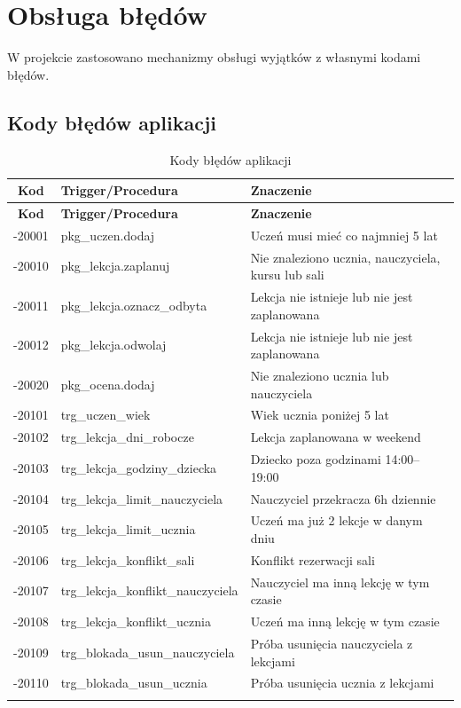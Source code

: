 \documentclass[12pt,a4paper]{article}
\begin{document}
\section{Obsługa błędów}

W projekcie zastosowano mechanizmy obsługi wyjątków z własnymi kodami błędów.

\subsection{Kody błędów aplikacji}

\begin{longtable}{|c|l|p{7cm}|}
\hline
\textbf{Kod} & \textbf{Trigger/Procedura} & \textbf{Znaczenie} \\
\hline
\endfirsthead
\hline
\textbf{Kod} & \textbf{Trigger/Procedura} & \textbf{Znaczenie} \\
\hline
\endhead
-20001 & pkg\_uczen.dodaj & Uczeń musi mieć co najmniej 5 lat \\
\hline
-20010 & pkg\_lekcja.zaplanuj & Nie znaleziono ucznia, nauczyciela, kursu lub sali \\
\hline
-20011 & pkg\_lekcja.oznacz\_odbyta & Lekcja nie istnieje lub nie jest zaplanowana \\
\hline
-20012 & pkg\_lekcja.odwolaj & Lekcja nie istnieje lub nie jest zaplanowana \\
\hline
-20020 & pkg\_ocena.dodaj & Nie znaleziono ucznia lub nauczyciela \\
\hline
-20101 & trg\_uczen\_wiek & Wiek ucznia poniżej 5 lat \\
\hline
-20102 & trg\_lekcja\_dni\_robocze & Lekcja zaplanowana w weekend \\
\hline
-20103 & trg\_lekcja\_godziny\_dziecka & Dziecko poza godzinami 14:00--19:00 \\
\hline
-20104 & trg\_lekcja\_limit\_nauczyciela & Nauczyciel przekracza 6h dziennie \\
\hline
-20105 & trg\_lekcja\_limit\_ucznia & Uczeń ma już 2 lekcje w danym dniu \\
\hline
-20106 & trg\_lekcja\_konflikt\_sali & Konflikt rezerwacji sali \\
\hline
-20107 & trg\_lekcja\_konflikt\_nauczyciela & Nauczyciel ma inną lekcję w tym czasie \\
\hline
-20108 & trg\_lekcja\_konflikt\_ucznia & Uczeń ma inną lekcję w tym czasie \\
\hline
-20109 & trg\_blokada\_usun\_nauczyciela & Próba usunięcia nauczyciela z lekcjami \\
\hline
-20110 & trg\_blokada\_usun\_ucznia & Próba usunięcia ucznia z lekcjami \\
\hline
\caption{Kody błędów aplikacji}
\end{longtable}
\end{document}
